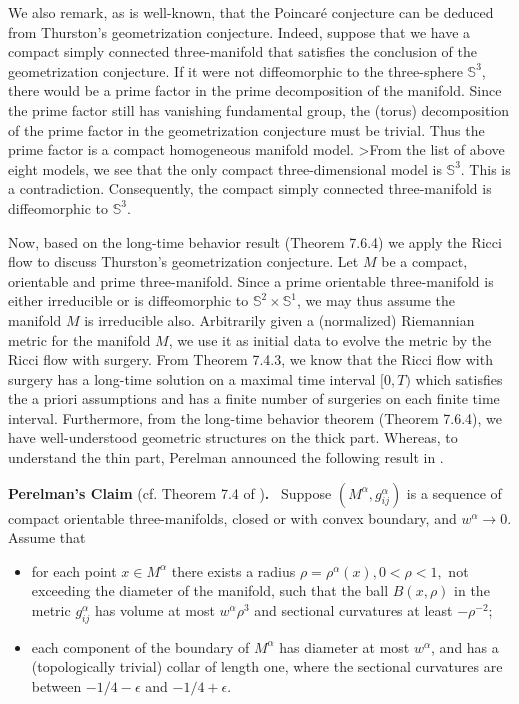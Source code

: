 We also remark, as is well-known, that the Poincar\'{e} conjecture
can be deduced from Thur\-ston's geometrization conjecture.
Indeed, suppose that we have a compact simply connected
three-manifold that satisfies the conclusion of the geometrization
conjecture. If it were not diffeomorphic to the three-sphere
$\mathbb{S}^3$, there would be a prime factor in the prime
decomposition of the manifold. Since the prime factor still has
vanishing fundamental group, the (torus) decomposition of the
prime factor in the geometrization conjecture must be trivial.
Thus the prime factor is a compact homogeneous manifold model.
>From the list of above eight models, we see that the only compact
three-dimensional model is $\mathbb{S}^3$. This is a
contradiction. Consequently, the compact simply connected
three-manifold is diffeomorphic to $\mathbb{S}^3$.

Now, based on the long-time behavior result (Theorem 7.6.4) we
apply the Ricci flow to discuss Thurston's geometrization
conjecture. Let $M$ be a compact, orientable and prime
three-manifold. Since a prime orientable three-manifold is either
irreducible or is diffeomorphic to $\mathbb{S}^2 \times
\mathbb{S}^1$, we may thus assume the manifold $M$ is irreducible
also. Arbitrarily given a (normalized) Riemannian metric for the
manifold $M$, we use it as initial data to evolve the metric by
the Ricci flow with surgery. From Theorem 7.4.3, we know that the
Ricci flow with surgery has a long-time solution on a maximal time
interval $[0,T)$ which satisfies the a priori assumptions and has
a finite number of surgeries on each finite time interval.
Furthermore, from the long-time behavior theorem (Theorem 7.6.4),
we have well-understood geometric structures on the thick part.
Whereas, to understand the thin part, Perelman announced the
following result in \cite{P2}.

\medskip
{\bf Perelman's Claim} (cf. Theorem 7.4 of
\cite{P2}){\bf .} \ Suppose $(M^{\alpha},g^{\alpha}_{ij})$ is a
sequence of compact orientable three-manifolds, closed or with
convex boundary, and $w^{\alpha}\rightarrow  0$. Assume that
\begin{itemize}
\item[(1)] for each point $x \in M^{\alpha}$ there exists a radius
$\rho = \rho^{\alpha}(x), 0<\rho<1,$ not exceeding the diameter of
the manifold, such that the ball $B(x,\rho)$ in the metric
$g^{\alpha}_{ij}$ has volume at most $w^{\alpha}\rho^3$ and
sectional curvatures at least $-\rho^{-2}$; \item[(2)] each
component of the boundary of $M^{\alpha}$ has diameter at most
$w^{\alpha}$, and has a (topologically trivial) collar of length
one, where the sectional curvatures are between $-1/4 - \epsilon$
and $-1/4 + \epsilon$.
\end{itemize}


